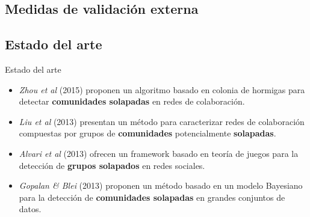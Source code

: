 \subsection{Medidas de validación externa}
\begin{frame}[t]
\end{frame}


\subsection{Estado del arte}
\begin{frame}[t]
	\begin{block}{Estado del arte}
		\begin{itemize}
			\item \textit{Zhou et al} (2015) proponen un algoritmo basado en colonia de hormigas para detectar \textbf{comunidades solapadas} en redes de colaboración.
			\item \textit{Liu et al} (2013) presentan un método para caracterizar redes de colaboración compuestas por grupos de \textbf{comunidades} potencialmente \textbf{solapadas}.
			\item \textit{Alvari et al} (2013) ofrecen un framework basado en teoría de juegos para la detección de  \textbf{grupos solapados} en redes sociales.
			\item \textit{Gopalan \& Blei} (2013) proponen un método basado en un modelo Bayesiano para la detección de \textbf{comunidades solapadas} en grandes conjuntos de datos.
		\end{itemize}
	\end{block}
\end{frame}


